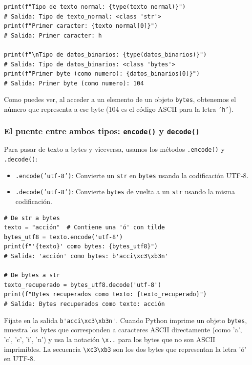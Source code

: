 \begin{lstlisting}[style=PythonStyle]
print(f"Tipo de texto_normal: {type(texto_normal)}")
# Salida: Tipo de texto_normal: <class 'str'>
print(f"Primer caracter: {texto_normal[0]}")
# Salida: Primer caracter: h

print(f"\nTipo de datos_binarios: {type(datos_binarios)}")
# Salida: Tipo de datos_binarios: <class 'bytes'>
print(f"Primer byte (como numero): {datos_binarios[0]}")
# Salida: Primer byte (como numero): 104
\end{lstlisting}

Como puedes ver, al acceder a un elemento de un objeto \texttt{bytes}, obtenemos el número que representa a ese byte (104 es el código ASCII para la letra \texttt{'h'}).

\subsubsection*{El puente entre ambos tipos: \texttt{encode()} y \texttt{decode()}}
Para pasar de texto a bytes y viceversa, usamos los métodos \texttt{.encode()} y \texttt{.decode()}:
\begin{itemize}
    \item \texttt{.encode('utf-8')}: Convierte un \texttt{str} en \texttt{bytes} usando la codificación UTF-8.
    \item \texttt{.decode('utf-8')}: Convierte \texttt{bytes} de vuelta a un \texttt{str} usando la misma codificación.
\end{itemize}

\begin{lstlisting}[style=PythonStyle]
# De str a bytes
texto = "acción"  # Contiene una 'ó' con tilde
bytes_utf8 = texto.encode('utf-8')
print(f"'{texto}' como bytes: {bytes_utf8}")
# Salida: 'acción' como bytes: b'acci\xc3\xb3n'

# De bytes a str
texto_recuperado = bytes_utf8.decode('utf-8')
print(f"Bytes recuperados como texto: {texto_recuperado}")
# Salida: Bytes recuperados como texto: acción
\end{lstlisting}

Fíjate en la salida \lstinline|b'acci\xc3\xb3n'|. Cuando Python imprime un objeto \texttt{bytes}, muestra los bytes que corresponden a caracteres ASCII directamente (como 'a', 'c', 'c', 'i', 'n') y usa la notación \lstinline|\x..| para los bytes que no son ASCII imprimibles. La secuencia \lstinline|\xc3\xb3| son los dos bytes que representan la letra 'ó' en UTF-8.


